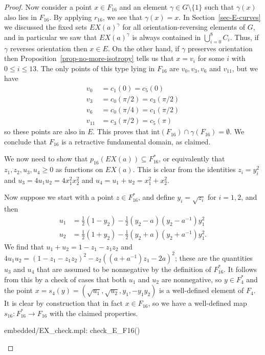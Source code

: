 \documentclass[reqno]{amsart}
\newcommand{\gm}        {\gamma}
\newcommand{\sm}        {\setminus}
\newcommand{\sse}       {\subseteq}
\newcommand{\half}      {\tfrac{1}{2}}
\renewcommand{\:}{\colon}
\theoremstyle{definition}
\begin{document}
\begin{proof}
 Now consider a point $x\in F_{16}$ and an element $\gm\in G\sm\{1\}$
 such that $\gm(x)$ also lies in $F_{16}$.  By applying $r_{16}$, we
 see that $\gm(x)=x$.  In Section~\ref{sec-E-curves} we
 discussed the fixed sets $EX(a)^\gm$ for all orientation-reversing
 elements of $G$, and in particular we saw that $EX(a)^\gm$ is always
 contained in $\bigcup_{i=0}^8C_i$.  Thus, if $\gm$ reverses
 orientation then $x\in E$.  On the other hand, if $\gm$ preserves
 orientation then Proposition~\ref{prop-no-more-isotropy} tells us
 that $x=v_i$ for some $i$ with $0\leq i\leq 13$.  The only points of
 this type lying in $F_{16}$ are $v_0,v_3,v_6$ and $v_{11}$, but we
 have
 \begin{align*}
  v_0 &= c_1(0) = c_5(0) \\
  v_3 &= c_0(\pi/2) = c_3(\pi/2) \\
  v_6 &= c_0(\pi/4) = c_1(\pi/2) \\
  v_{11} &= c_3(\pi/2) = c_5(\pi)
 \end{align*}
 so these points are also in $E$.  This proves that
 $\text{int}(F_{16})\cap\gm(F_{16})=\emptyset$.  We conclude that
 $F_{16}$ is a retractive fundamental domain, as claimed.

 We now need to show that $p_{16}(EX(a))\sse F_{16}^*$, or equivalently
 that $z_1,z_2,u_3,u_4\geq 0$ as functions on $EX(a)$.  This is clear from
 the identities $z_i=y_i^2$ and $u_3=4u_1u_2=4x_1^2x_2^2$ and
 $u_4=u_1+u_2=x_1^2+x_2^2$.

 Now suppose we start with a point $z\in F_{16}^*$, and define
 $y_i=\sqrt{z_i}$ for $i=1,2$, and then
 \begin{align*}
  u_1 &= \half(1-y_2) - \half(y_2-a)(y_2-a^{-1})y_1^2 \\
  u_2 &= \half(1+y_2) - \half(y_2+a)(y_2+a^{-1})y_1^2.
 \end{align*}
 We find that $u_1+u_2=1-z_1-z_1z_2$ and
 $4u_1u_2=(1-z_1-z_1z_2)^2 - z_2((a+a^{-1})z_1-2a)^2$; these are the
 quantities $u_3$ and $u_4$ that are assumed to be nonnegative by the
 definition of $F_{16}^*$.  It follows from this by a check of cases
 that both $u_1$ and $u_2$ are nonnegative, so $y\in F_4^*$ and
 the point $x=s_4(y)=(\sqrt{u_1},\sqrt{u_2},y_1,-y_1y_2)$ is a
 well-defined element of $F_4$.  It is clear by construction that
 in fact $x\in F_{16}$, so we have a well-defined map
 $s_{16}\:F_{16}^*\to F_{16}$ with the claimed properties.
 \begin{checks}
  embedded/EX_check.mpl: check_E_F16()
 \end{checks}
\end{proof}
\end{document}
